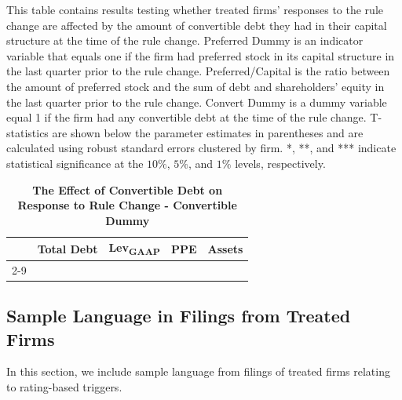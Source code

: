\documentclass[a4paper, 12pt]{article}
\begin{document}
\begin{landscape}
\pagestyle{empty}

\begin{table}[htbp]
\caption{\textbf{The Effect of Convertible Debt on Response to Rule Change - Convertible Dummy}} \label{table_convert_dummy}
\begin{singlespace}
\begin{small}

\noindent   This table contains results testing whether treated firms' responses to the rule change are affected by the amount of convertible debt they had in their capital structure at the time of the rule change. Preferred Dummy is an indicator variable that equals one if the firm had preferred stock in its capital structure in the last quarter prior to the rule change. Preferred/Capital is the ratio between the amount of preferred stock and the sum of debt and shareholders' equity in the last quarter prior to the rule change. Convert Dummy is a dummy variable equal 1 if the firm had any convertible debt at the time of the rule change. T-statistics are shown below the parameter estimates in parentheses and are calculated using robust standard errors clustered by firm. *, **, and *** indicate statistical significance at the $10\%$, $5\%$, and $1\%$ levels, respectively.
\end{small}
\end{singlespace}
\vspace{3mm}

\small
  \centering
    \begin{tabular}{lcccccccc}
    \toprule
        \textbf{ } &
      \multicolumn{2}{c}{\textbf{Total Debt}} &  \multicolumn{2}{c}{\textbf{Lev\textsubscript{GAAP}}} &
         \multicolumn{2}{c}{\textbf{PPE}} &  \multicolumn{2}{c}{\textbf{Assets}}
      \\
           \cline{2-9}




    \bottomrule
    \end{tabular}
\end{table}
\end{landscape}


\clearpage


\subsection*{Sample Language in Filings from Treated Firms}\label{filing_lang}
In this section, we include sample language from filings of treated firms relating to rating-based triggers.
\end{document}
